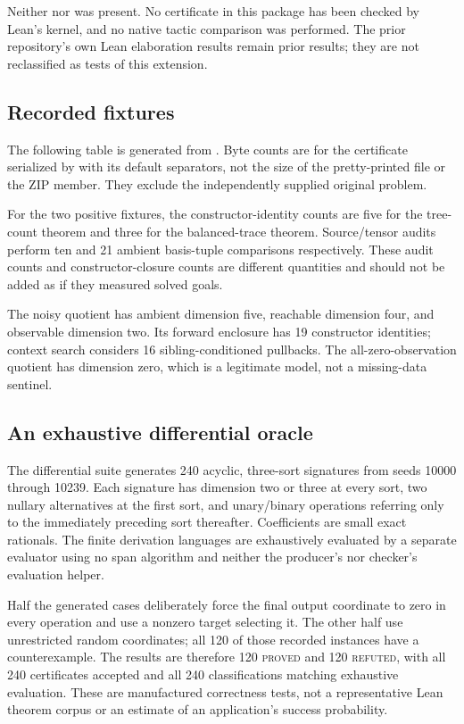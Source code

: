 \documentclass[11pt,letterpaper]{article}
\theoremstyle{definition}\newtheorem{definition}[theorem]{Definition}
\theoremstyle{remark}\newtheorem{remark}[theorem]{Remark}
\newcommand{\code}[1]{\texttt{\detokenize{#1}}}
\newcommand{\proved}{\textsc{proved}}
\newcommand{\refuted}{\textsc{refuted}}
\begin{document}
Neither \code{lean} nor \code{lake} was present. No certificate in this package has been checked by Lean's kernel, and no native tactic comparison was performed. The prior repository's own Lean elaboration results remain prior results; they are not reclassified as tests of this extension.

\subsection{Recorded fixtures}
The following table is generated from . Byte counts are for the certificate serialized by \code{json.dumps(..., sort_keys=True)} with its default separators, not the size of the pretty-printed file or the ZIP member. They exclude the independently supplied original problem.



For the two positive fixtures, the constructor-identity counts are five for the tree-count theorem and three for the balanced-trace theorem. Source/tensor audits perform ten and 21 ambient basis-tuple comparisons respectively. These audit counts and constructor-closure counts are different quantities and should not be added as if they measured solved goals.

The noisy quotient has ambient dimension five, reachable dimension four, and observable dimension two. Its forward enclosure has 19 constructor identities; context search considers 16 sibling-conditioned pullbacks. The all-zero-observation quotient has dimension zero, which is a legitimate model, not a missing-data sentinel.

\subsection{An exhaustive differential oracle}
The differential suite generates 240 acyclic, three-sort signatures from seeds 10000 through 10239. Each signature has dimension two or three at every sort, two nullary alternatives at the first sort, and unary/binary operations referring only to the immediately preceding sort thereafter. Coefficients are small exact rationals. The finite derivation languages are exhaustively evaluated by a separate evaluator using no span algorithm and neither the producer's nor checker's evaluation helper.

Half the generated cases deliberately force the final output coordinate to zero in every operation and use a nonzero target selecting it. The other half use unrestricted random coordinates; all 120 of those recorded instances have a counterexample. The results are therefore 120 \proved{} and 120 \refuted{}, with all 240 certificates accepted and all 240 classifications matching exhaustive evaluation. These are manufactured correctness tests, not a representative Lean theorem corpus or an estimate of an application's success probability.
\end{document}
